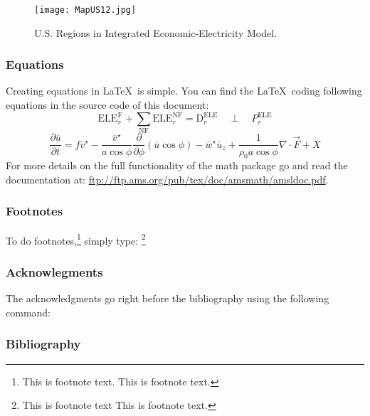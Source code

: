 \documentclass[12pt,fleqn]{article}
\let\oldverbatim\verbatim
\let\oldendverbatim\endverbatim
\renewenvironment{verbatim}{\endgraf\footnotesize\singlespace\oldverbatim}{\oldendverbatim\endsinglespace}
\begin{document}
\begin{figure}[h]
  \centering
  \noindent\texttt{[image: MapUS12.jpg]}\\
  \caption{U.S. Regions in Integrated Economic-Electricity Model.}\label{fig:mapregionalaggregation}
\end{figure}

\subsubsection{Equations}

Creating equations in \LaTeX\, is simple. You can find the \LaTeX\, coding following equations in the source code of this document:
\begin{equation}\label{eq1}
\text{ELE}^{\text{F}}_r + \sum_{\text{NF}} \text{ELE}^{\text{NF}}_r = \text{D}^{\text{ELE}}_r \quad \perp \quad P^{\text{ELE}}_r
\end{equation}
\begin{equation}\label{eq2}
\frac{\partial \overline{u}}{\partial t}=f\overline{v}^\star-\frac{\overline{v}^\star}{a\cos \phi} \frac{\partial}{\partial \phi} \left(\overline{u} \cos \phi \right)-\overline{w}^\star \overline{u}_{z}+\frac{1}{\rho_{0} a \cos \phi}\nabla\cdot\vec{F}+\overline{X}
\end{equation}
For more details on the full functionality of the math package go and read the documentation at: \url{ftp://ftp.ams.org/pub/tex/doc/amsmath/amsldoc.pdf}.


\subsubsection{Footnotes}

To do footnotes,\footnote{This is footnote text. This is footnote text.} simply
type:
\begin{verbatim}
\footnote{This is footnote text This is footnote text.}
\end{verbatim}

\subsubsection{Acknowlegments}

The acknowledgments go right before the bibliography using the following command:
\begin{verbatim}
\acknowledgments{}
\end{verbatim}

\subsubsection{Bibliography}
\end{document}
